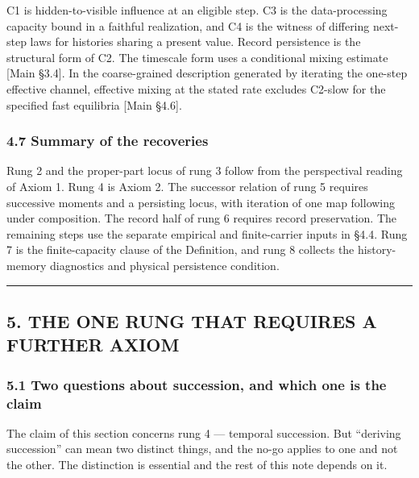 \documentclass[
]{article}
\begin{document}
C1 is hidden-to-visible influence at an eligible step. C3 is the
data-processing capacity bound in a faithful realization, and C4 is the
witness of differing next-step laws for histories sharing a present
value. Record persistence is the structural form of C2. The timescale
form uses a conditional mixing estimate {[}Main §3.4{]}. In the
coarse-grained description generated by iterating the one-step effective
channel, effective mixing at the stated rate excludes C2-slow for the
specified fast equilibria {[}Main §4.6{]}.

\hypertarget{summary-of-the-recoveries}{%
\subsubsection{4.7 Summary of the
recoveries}\label{summary-of-the-recoveries}}

Rung 2 and the proper-part locus of rung 3 follow from the perspectival
reading of Axiom 1. Rung 4 is Axiom 2. The successor relation of rung 5
requires successive moments and a persisting locus, with iteration of
one map following under composition. The record half of rung 6 requires
record preservation. The remaining steps use the separate empirical and
finite-carrier inputs in §4.4. Rung 7 is the finite-capacity clause of
the Definition, and rung 8 collects the history-memory diagnostics and
physical persistence condition.

\begin{center}\rule{0.5\linewidth}{0.5pt}\end{center}

\hypertarget{the-one-rung-that-requires-a-further-axiom}{%
\subsection{5. THE ONE RUNG THAT REQUIRES A FURTHER
AXIOM}\label{the-one-rung-that-requires-a-further-axiom}}

\hypertarget{two-questions-about-succession-and-which-one-is-the-claim}{%
\subsubsection{5.1 Two questions about succession, and which one is the
claim}\label{two-questions-about-succession-and-which-one-is-the-claim}}

The claim of this section concerns rung 4 --- temporal succession. But
``deriving succession'' can mean two distinct things, and the no-go
applies to one and not the other. The distinction is essential and the
rest of this note depends on it.
\end{document}
